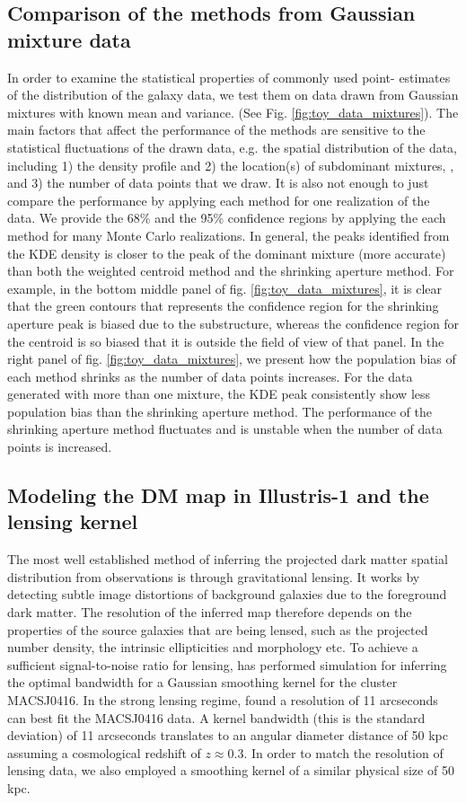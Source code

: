 \subsection{Comparison of the methods from Gaussian mixture data}
In order to examine the statistical properties of commonly used point-
estimates of the distribution of the galaxy data, we test them on data drawn 
from Gaussian mixtures with known mean and variance. (See Fig.
\ref{fig:toy_data_mixtures}). The main factors that affect the performance of 
the methods are sensitive to the statistical fluctuations of the drawn data, 
e.g. the
spatial distribution of the data, including 1) the density profile and 2) the
location(s) of subdominant mixtures,
, and 3) the number of data points that we draw.
It is also not enough to just
compare the performance by applying each method for one realization of the
data. We provide the 68\% and the 95\% confidence regions by applying the
each method for many Monte Carlo realizations.
In general, the peaks identified from the KDE density is closer to the 
peak of the dominant mixture (more accurate) than 
both the weighted centroid method and the shrinking aperture method.
For example, in the bottom middle panel of fig. \ref{fig:toy_data_mixtures}, 
it is clear that the green contours
that represents the confidence region for the shrinking aperture peak is
biased due to the substructure, whereas the confidence region for the centroid 
is so biased that it is outside the field of view of that panel.
In the right panel of fig. \ref{fig:toy_data_mixtures}, 
we present how the population bias of each method shrinks as the
number of data points increases. For the data generated with more than one mixture, 
the KDE peak consistently show less population bias than the shrinking aperture method. 
The performance of the shrinking aperture method fluctuates and is unstable when
the number of data points is increased.

\subsection{Modeling the DM map in Illustris-1 and the lensing kernel}
The most well established method of inferring the projected dark matter spatial 
distribution from observations is through gravitational lensing.
It works by detecting subtle image distortions of background galaxies due to
the foreground dark matter. The resolution of the inferred map therefore 
depends on the properties of the source galaxies that are being lensed, 
such as the projected number density, the intrinsic ellipticities and morphology etc.
To achieve a sufficient signal-to-noise ratio for lensing, 
\cite{Hoag2016} has performed simulation for inferring the optimal bandwidth
for a Gaussian smoothing kernel for the cluster MACSJ0416. 
In the strong lensing regime, \cite{Hoag2016} found a resolution of 11 arcseconds
can best fit the MACSJ0416 data. A kernel bandwidth (this is the standard deviation) 
of 11 arcseconds translates to an angular diameter distance of 50 
kpc assuming a cosmological redshift of $z \approx 0.3$. 
In order to match the resolution of lensing data,
we also employed a smoothing kernel of a similar physical size of 50 kpc.  

